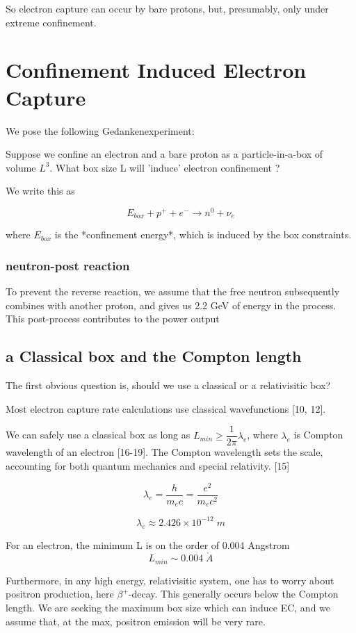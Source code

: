 \documentclass[11pt]{amsart}
\begin{document}
So electron capture can occur by bare protons, but, presumably, only under extreme confinement.

\section{Confinement Induced Electron Capture}

We pose the following Gedankenexperiment:  

Suppose we confine an electron and a bare proton as a particle-in-a-box of volume $L^3$.  What box size L will 'induce' electron confinement ?

We write this as

$$E_{box}+p^{+}+e^{-}\rightarrow n^{0}+\nu_{e}$$

where $E_{box}$ is the *confinement energy*, which is induced by the box constraints. 

\subsubsection{neutron-post reaction}

To prevent the reverse reaction, we assume that the free neutron subsequently combines with another proton, and gives us 2.2 GeV of energy in the process.  This post-process contributes to the power output

\subsection{a Classical box and the Compton length}
The first obvious question is, should we use a classical or a relativisitic box?   

Most electron capture rate calculations use classical wavefunctions [10, 12].  

We can safely use a classical box as long as $L_{min} \ge \dfrac{1}{2\pi}\lambda_{e}$, where $\lambda_{e}$ is Compton wavelength of an electron [16-19].  The Compton wavelength sets the scale, accounting for both quantum mechanics and special relativity. [15]

$$\lambda_{e}=\dfrac{h}{m_{e}c}=\dfrac{e^{2}}{m_{e}c^{2}}$$

$$\lambda_{e}\approx2.426\times 10^{-12}\;m$$

For an electron, the minimum L is on the order of 0.004 Angstrom 
$$L_{min}\sim0.004\;\mathring{A}$$ 

Furthermore, in any high energy, relativisitic system, one has to worry about positron production, here $\beta^{+}$-decay. This generally occurs below the Compton length. We are seeking the maximum box size which can induce EC, and we assume that, at the max, positron emission will be very rare.
\end{document}
